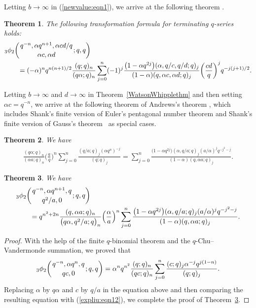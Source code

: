 \documentclass[pdftex]{sigma}
\numberwithin{equation}{section}
\newtheorem{Theorem}{Theorem}[section]
\begin{document}
 Letting $b\to \infty$ in (\ref{newvalue:eqn1}), we arrive at the following theorem \cite[Proposition~2.3]{Liu2013IJTN}.
 \begin{Theorem}\label{spwwthm} The following transformation formula for terminating $q$-series holds:
 	\begin{align}
 	&{_3\phi_2}\biggl({{q^{-n}, \alpha q^{n+1}, \alpha cd/q }\atop{\alpha c, \alpha d}}; q, q\biggr)\nonumber\\
 	&\qquad{}=(-\alpha)^n q^{n(n+1)/2}\frac{(q; q)_n}{(q\alpha; q)_n}
 	\sum_{j=0}^n (-1)^j\frac{\bigl(1-\alpha q^{2j}\bigr) (\alpha, q/c, q/d; q)_j}
 	{(1-\alpha)(q, \alpha c, \alpha d; q)_j}\biggl(\frac{ cd}{q}\biggr)^{j} q^{-j(j+1)/2}.\label{expliu:eqn11}
 \end{align}
 \end{Theorem}	
Letting $b \to \infty$ and $d\to \infty$ in Theorem~\ref{WatsonWhipplethm} and then setting $\alpha c=q^{-n}$,
we arrive at the following theorem of Andrews's theorem \cite[equation~(4.6)]{Andrews86}, which includes Shank's finite version of Euler's pentagonal number theorem \cite{Shanks1951} and Shank's finite version of Gauss's theorem~\cite{Shanks1958} as special cases.
\begin{Theorem} %
We have
\begin{align}\label{expliu:eqn12}
\frac{(q\alpha; q)_n}{(\alpha a; q)_n}\biggl(\frac{a}{q}\biggr)^n
	\sum_{j=0}^n \frac{(q/a; q)_j (\alpha q^n)^{-j}}{(q; q)_j}
=\sum_{j=0}^n \frac{\bigl(1-\alpha q^{2j}\bigr) (\alpha, q/a; q)_j (a/{\alpha})^j q^{-j^2-j}}{(1-\alpha)(q, \alpha a; q)_j}.
\end{align}	
\end{Theorem}

\begin{Theorem}\label{andrewsliu} We have
\begin{align*}%
&{_3\phi_2}\biggl({{q^{-n}, \alpha q^{n+1},q}\atop{q^2/a, 0}}; q, q\biggr)\\
&\qquad{}=q^{n^2+2n} \frac{(q, \alpha a; q)_n}{\bigl(q\alpha, q^2/a; q\bigr)_n} \Bigl(\frac{\alpha}{a}\Bigr)^n \sum_{j=0}^n \frac{\bigl(1-\alpha q^{2j}\bigr) (\alpha, q/a; q)_j (a/{\alpha})^j q^{-j^2-j}}{(1-\alpha)(q, \alpha a; q)_j}.\nonumber
\end{align*}	
\end{Theorem}
\begin{proof}
 With the help of the finite $q$-binomial theorem and the $q$-Chu--Vandermonde summation, we \cite[Lemma~4.1]{Liu2013RamanJ} proved that
	\begin{align*}%
	{_3\phi_2}\biggl({{q^{-n}, \alpha q^n,q}\atop{qc, 0}}; q, q\biggr)
	=\alpha^n q^{n^2}\frac{(q; q)_n}{(qc; q)_n}
		\sum_{j=0}^n \frac{(c; q)_j \alpha^{-j} q^{j(1-n)}}{(q; q)_j}.
	\end{align*}
Replacing $\alpha$ by $q\alpha$ and $c$ by $q/a$ in the equation above and then comparing the resulting equation with (\ref{expliu:eqn12}), we complete the proof of Theorem~\ref{andrewsliu}.
\end{proof}
\end{document}
